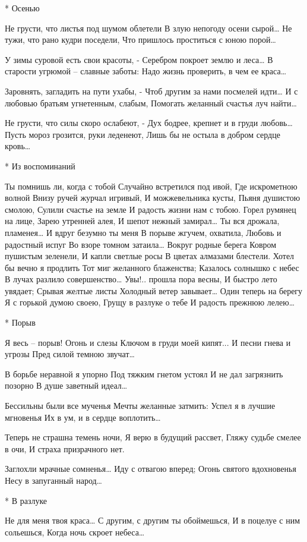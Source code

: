 * Осенью

Не грусти, что листья под шумом облетели
В злую непогоду осени сырой…
Не тужи, что рано кудри поседели,
Что пришлось проститься с юною порой…

У зимы суровой есть свои красоты, -
Серебром покроет землю и леса…
В старости угрюмой – славные заботы:
Надо жизнь проверить, в чем ее краса…

Заровнять, загладить на пути ухабы, -
Чтоб другим за нами посмелей идти…
И с любовью братьям угнетенным, слабым,
Помогать желанный счастья луч найти…

Не грусти, что силы скоро ослабеют, -
Дух бодрее, крепнет и в груди любовь…
Пусть мороз грозится, руки леденеют,
Лишь бы не остыла в добром сердце кровь…


* Из воспоминаний

Ты помнишь ли, когда с тобой
Случайно встретился под ивой,
Где искрометною волной
Внизу ручей журчал игривый,
И можжевельника кусты,
Пьяня душистою смолою,
Сулили счастье на земле
И радость жизни нам с тобою.
Горел румянец на лице,
Зарею утренней алея,
И шепот нежный замирал…
Ты вся дрожала, пламенея…
И вдруг безумно ты меня
В порыве жгучем, охватила,
Любовь и радостный испуг
Во взоре томном затаила…
Вокруг родные берега
Ковром пушистым зеленели,
И капли светлые росы
В цветах алмазами блестели.
Хотел бы вечно я продлить
Тот миг желанного блаженства;
Казалось солнышко с небес
В лучах разлило совершенство…
Увы!.. прошла пора весны,
И быстро лето увядает;
Срывая желтые листы
Холодный ветер завывает…
Один теперь на берегу
Я с горькой думою своею,
Грущу в разлуке о тебе
И радость прежнюю лелею…


* Порыв

Я весь – порыв! Огонь и слезы
Ключом в груди моей кипят...
И песни гнева и угрозы
Пред силой темною звучат…

В борьбе неравной я упорно
Под тяжким гнетом устоял
И не дал загрязнить позорно
В душе заветный идеал…

Бессильны были все мученья
Мечты желанные затмить:
Успел я в лучшие мгновенья
Их в ум, и в сердце воплотить…

Теперь не страшна темень ночи,
Я верю в будущий рассвет,
Гляжу судьбе смелее в очи,
И страха призрачного нет.

Заглохли мрачные сомненья…
Иду с отвагою вперед;
Огонь святого вдохновенья
Несу в запуганный народ…


* В разлуке

Не для меня твоя краса…
С другим, с другим ты обоймешься,
И в поцелуе с ним сольешься,
Когда ночь скроет небеса…

